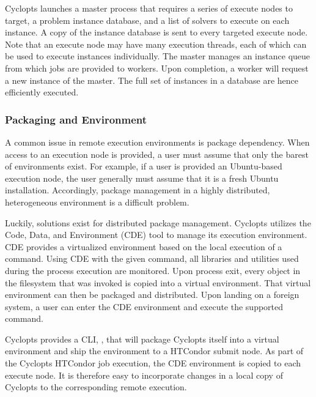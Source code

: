 Cyclopts launches a master process that requires a series of execute nodes to
target, a problem instance database, and a list of solvers to execute on each
instance. A copy of the instance database is sent to every targeted execute
node. Note that an execute node may have many execution threads, each of which
can be used to execute instances individually. The master manages an instance
queue from which jobs are provided to workers. Upon completion, a worker will
request a new instance of the master. The full set of instances in a database
are hence efficiently executed.

\subsubsection{Packaging and Environment}

A common issue in remote execution environments is package dependency. When
access to an execution node is provided, a user must assume that only the barest
of environments exist. For example, if a user is provided an Ubuntu-based
execution node, the user generally must assume that it is a fresh Ubuntu
installation. Accordingly, package management in a highly distributed,
heterogeneous environment is a difficult problem.

Luckily, solutions exist for distributed package management. Cyclopts utilizes
the Code, Data, and Environment (CDE) \cite{cde} tool to manage its execution
environment. CDE provides a virtualized environment based on the local execution
of a command. Using CDE with the given command, all libraries and utilities used
during the process execution are monitored. Upon process exit, every object in
the filesystem that was invoked is copied into a virtual environment. That
virtual environment can then be packaged and distributed. Upon landing on a
foreign system, a user can enter the CDE environment and execute the supported
command.

Cyclopts provides a CLI, , that will package Cyclopts itself
into a virtual environment and ship the environment to a HTCondor submit node. As
part of the Cyclopts HTCondor job execution, the CDE environment is copied to each
execute node. It is therefore easy to incorporate changes in a local copy of
Cyclopts to the corresponding remote execution.
